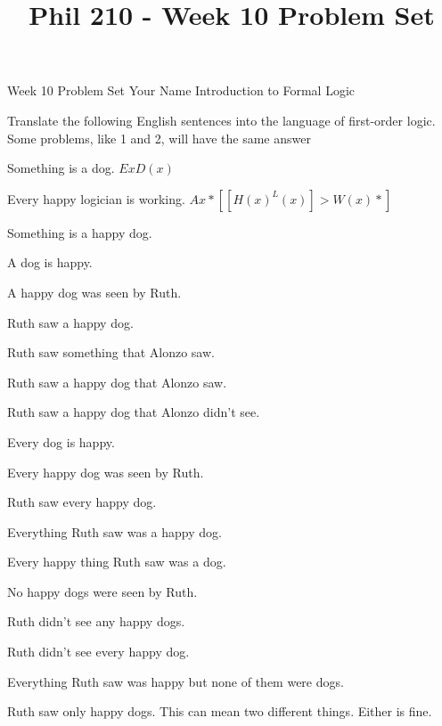 
\title{Phil 210 - Week 10 Problem Set}

\heading
Week 10 Problem Set
Your Name
Introduction to Formal Logic
\endheading

Translate the following English sentences into the language of first-order logic. Some problems, like 1 and 2, will have the same answer

\quantifiers
\problems
{}
Something is a dog.
	\answer 
	$ Ex D(x) $
	\endanswer\Bigskip

Every happy logician is working.
	\answer 
	$ Ax*[[H(x) ^ L(x)] > W(x)*] $
	\endanswer

Something is a happy dog.
	\answer
	$ $
	\endanswer

A dog is happy.
	\answer
	$ $
	\endanswer

A happy dog was seen by Ruth.
	\answer
	$ $
	\endanswer

Ruth saw a happy dog.
	\answer
	$ $
	\endanswer

Ruth saw something that Alonzo saw.
	\answer
	$ $
	\endanswer

Ruth saw a happy dog that Alonzo saw.
	\answer
	$ $
	\endanswer

Ruth saw a happy dog that Alonzo didn't see.
	\answer
	$ $
	\endanswer

Every dog is happy.
	\answer
	$ $
	\endanswer

Every happy dog was seen by Ruth.
	\answer
	$ $
	\endanswer

Ruth saw every happy dog.
	\answer
	$ $
	\endanswer

Everything Ruth saw was a happy dog.
	\answer
	$ $
	\endanswer

Every happy thing Ruth saw was a dog.
	\answer
	$ $
	\endanswer

No happy dogs were seen by Ruth.
	\answer
	$ $
	\endanswer

Ruth didn't see any happy dogs.
	\answer
	$ $
	\endanswer

Ruth didn't see every happy dog.
	\answer
	$ $
	\endanswer

Everything Ruth saw was happy but none of them were dogs.
	\answer
	$ $
	\endanswer

Ruth saw only happy dogs.
\Hint This can mean two different things. Either is fine.
	\answer
	$ $
	\endanswer

